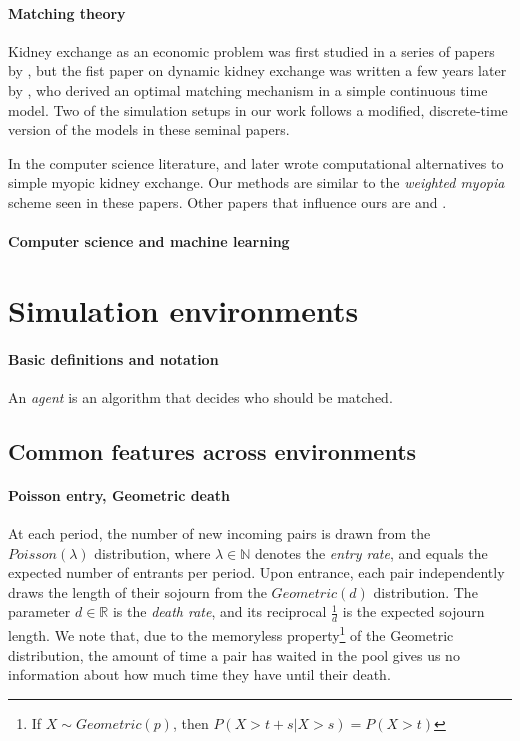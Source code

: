 \documentclass[format=acmsmall, review=false]{acmart}
\begin{document}
\paragraph{Matching theory} Kidney exchange as an economic problem was first studied in a series of papers by \citet{roth2004kidney, roth2005pairwise, roth2007efficient}, but the fist paper on dynamic kidney exchange was written a few years later by \citet{unver2010dynamic}, who derived an optimal matching mechanism in a simple continuous time model. Two of the simulation setups in our work follows a modified, discrete-time version of the models in these seminal papers.

In the computer science literature, \citet{awasthi2009online} and later \citet{dickerson2015futurematch} wrote computational alternatives to simple myopic kidney exchange. Our methods are similar to the \emph{weighted myopia} scheme seen in these papers. Other papers that influence ours are \citet{akbarpour2017thickness} and \citet{ashlagi2013kidney}.



\paragraph{Computer science and machine learning}



\section{Simulation environments}

\paragraph{Basic definitions and notation} 

An \emph{agent} is an algorithm that decides who should be matched. 


\subsection{Common features across environments}

\paragraph{Poisson entry, Geometric death} At each period, the number of new incoming pairs is drawn from the $Poisson(\lambda)$ distribution, where $\lambda \in \mathbb{N}$ denotes the \emph{entry rate}, and equals the expected number of entrants per period. Upon entrance, each pair independently draws the length of their sojourn from the $Geometric(d)$ distribution. The parameter $d \in \mathbb{R}$ is the \emph{death rate}, and its reciprocal $\frac{1}{d}$ is the expected sojourn length. We note that, due to the memoryless property\footnote{If $X \sim Geometric(p)$, then $P(X > t+s | X > s) = P(X > t)$} of the Geometric distribution, the amount of time a pair has waited in the pool gives us no information about how much time they have until their death.
\end{document}
